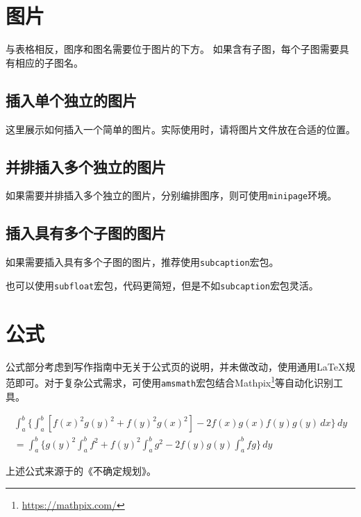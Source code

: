\section{图片}
\label{sec:figure}

与表格相反，图序和图名需要位于图片的下方。
如果含有子图，每个子图需要具有相应的子图名。

\subsection{插入单个独立的图片}
这里展示如何插入一个简单的图片。实际使用时，请将图片文件放在合适的位置。

\subsection{并排插入多个独立的图片}
如果需要并排插入多个独立的图片，分别编排图序，则可使用\verb|minipage|环境。

\subsection{插入具有多个子图的图片}
如果需要插入具有多个子图的图片，推荐使用\verb|subcaption|宏包。

也可以使用\verb|subfloat|宏包，代码更简短，但是不如\verb|subcaption|宏包灵活。

\section{公式}
\label{sec:equation}

公式部分考虑到写作指南中无关于公式页的说明，并未做改动，使用通用\LaTeX{}规范即可。对于复杂公式需求，可使用\verb|amsmath|宏包结合Mathpix\footnote{\url{https://mathpix.com/}}等自动化识别工具。

\begin{multline*}
\int_a^b\biggl\{\int_a^b[f(x)^2g(y)^2+f(y)^2g(x)^2]
 -2f(x)g(x)f(y)g(y)\,dx\biggr\}\,dy \\
 =\int_a^b\biggl\{g(y)^2\int_a^bf^2+f(y)^2
    \int_a^b g^2-2f(y)g(y)\int_a^b fg\biggr\}\,dy
\end{multline*}

上述公式来源于\citeauthor{liu2003uncertain}的《不确定规划》\cite{liu2003uncertain}。
